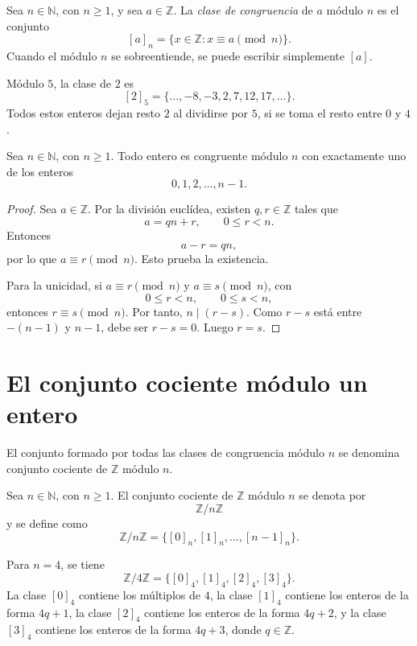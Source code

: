 \begin{definicion}
Sea \(n\in\mathbb{N}\), con \(n\geq 1\), y sea \(a\in\mathbb{Z}\). La \emph{clase de congruencia} de \(a\) módulo \(n\) es el conjunto
\[
  [a]_n = \{x\in\mathbb{Z}: x\equiv a\pmod n\}.
\]
Cuando el módulo \(n\) se sobreentiende, se puede escribir simplemente \([a]\).
\end{definicion}

\begin{ejemplo}
Módulo \(5\), la clase de \(2\) es
\[
  {[2]}_5=\{\ldots,-8,-3,2,7,12,17,\ldots\}.
\]
Todos estos enteros dejan resto \(2\) al dividirse por \(5\), si se toma el resto entre \(0\) y \(4\).
\end{ejemplo}

\begin{proposicion}
Sea \(n\in\mathbb{N}\), con \(n\geq 1\). Todo entero es congruente módulo \(n\) con exactamente uno de los enteros
\[
  0,1,2,\ldots,n-1.
\]
\end{proposicion}

\begin{proof}
Sea \(a\in\mathbb{Z}\). Por la división euclídea, existen \(q,r\in\mathbb{Z}\) tales que
\[
  a=qn+r, \qquad 0\leq r<n.
\]
Entonces
\[
  a-r=qn,
\]
por lo que \(a\equiv r\pmod n\). Esto prueba la existencia.

Para la unicidad, si \(a\equiv r\pmod n\) y \(a\equiv s\pmod n\), con
\[
  0\leq r<n, \qquad 0\leq s<n,
\]
entonces \(r\equiv s\pmod n\). Por tanto, \(n\mid(r-s)\). Como \(r-s\) está entre \(-(n-1)\) y \(n-1\), debe ser \(r-s=0\). Luego \(r=s\).
\end{proof}

\section{El conjunto cociente módulo un entero}

El conjunto formado por todas las clases de congruencia módulo \(n\) se denomina conjunto cociente de \(\mathbb{Z}\) módulo \(n\).

\begin{definicion}
Sea \(n\in\mathbb{N}\), con \(n\geq 1\). El conjunto cociente de \(\mathbb{Z}\) módulo \(n\) se denota por
\[
  \mathbb{Z}/n\mathbb{Z}
\]
y se define como
\[
  \mathbb{Z}/n\mathbb{Z}=\{{[0]}_n,{[1]}_n,\ldots,[n-1]_n\}.
\]
\end{definicion}

\begin{ejemplo}
Para \(n=4\), se tiene
\[
  \mathbb{Z}/4\mathbb{Z}=\{{[0]}_4,{[1]}_4,{[2]}_4,[3]_4\}.
\]
La clase \({[0]}_4\) contiene los múltiplos de \(4\), la clase \({[1]}_4\) contiene los enteros de la forma \(4q+1\), la clase \({[2]}_4\) contiene los enteros de la forma \(4q+2\), y la clase \([3]_4\) contiene los enteros de la forma \(4q+3\), donde \(q\in\mathbb{Z}\).
\end{ejemplo}

